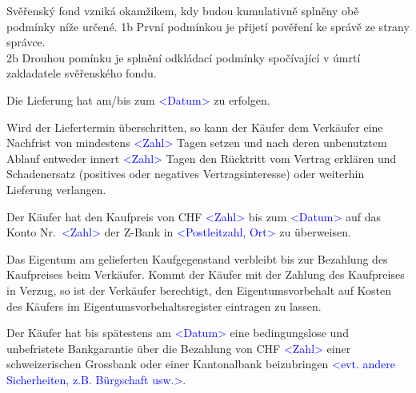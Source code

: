 \documentclass[parskip=half]{scrreprt}
\begin{document}
\begin{contract}
Svěřenský fond vzniká okamžikem, kdy budou kumulativně splněny obě podmínky níže určené.
1b První podmínkou je přijetí pověření ke správě ze strany správce.\\
2b Drouhou pomínku je splnění odkládací podmínky spočívající v úmrtí zakladatele svěřenského fondu.

Die Lieferung hat am/bis zum \textcolor{blue}{<Datum>} zu erfolgen.

Wird der Liefertermin überschritten, so kann der Käufer dem Verkäufer eine Nachfrist von mindestens \textcolor{blue}{<Zahl>} Tagen setzen und nach deren unbenutztem Ablauf entweder innert \textcolor{blue}{<Zahl>} Tagen den Rücktritt vom Vertrag erklären und Schadenersatz (positives oder negatives Vertragsinteresse) oder weiterhin Lieferung verlangen.

\parnumbertrue





Der Käufer hat den Kaufpreis von CHF \textcolor{blue}{<Zahl>} bis zum \textcolor{blue}{<Datum>} auf das Konto Nr.~\textcolor{blue}{<Zahl>} der Z-Bank in \textcolor{blue}{<Postleitzahl, Ort>} zu überweisen.

Das Eigentum am gelieferten Kaufgegenstand verbleibt bis zur Bezahlung des Kaufpreises beim Verkäufer. Kommt der Käufer mit der Zahlung des Kaufpreises in Verzug, so ist der Verkäufer berechtigt, den Eigentumsvorbehalt auf Kosten des Käufers im Eigentumsvorbehaltsregister eintragen zu lassen.

Der Käufer hat bis spätestens am \textcolor{blue}{<Datum>} eine bedingungslose und unbefristete Bankgarantie über die Bezahlung von CHF \textcolor{blue}{<Zahl>} einer schweizerischen Grossbank oder einer Kantonalbank beizubringen \textcolor{blue}{<evt. andere Sicherheiten, z.B. Bürgschaft usw.>}.

\parnumbertrue


\end{contract}
\end{document}
